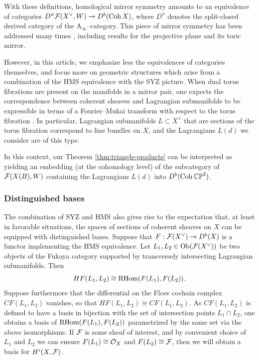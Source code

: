 \documentclass[12pt]{amsart}
\begin{document}
With these definitions, homological mirror symmetry amounts to an
equivalence of categories $D^\pi \mathcal{F}(X^\vee,W) \to D^b(\operatorname{Coh} X)$, where
$D^\pi$ denotes the split-closed derived category of the
A$_\infty$--category. This piece of mirror symmetry has been addressed
many times
\cite{ako08,ako06,seidel01b,abouzaid06,abouzaid09,fltz-T-duality},
including results for the projective plane and its toric mirror.

However, in this article, we emphasize less the equivalences of
categories themselves, and focus more on geometric structures which
arise from a combination of the HMS equivalence with the SYZ picture.
When dual torus fibrations are present on the manifolds in a mirror
pair, one expects the correspondence between coherent sheaves and
Lagrangian submanifolds to be expressible in terms of a Fourier--Mukai
transform with respect to the torus fibration \cite{lyz}. In
particular, Lagrangian submanifolds $L \subset X^\vee$ that are
sections of the torus fibration correspond to line bundles on $X$, and
the Lagrangians $L(d)$ we consider are of this type.
 
In this context, our Theorem \ref{thm:triangle-products} can be
interpreted as yielding an embedding (at the cohomology level) of the
subcategory of $\mathcal{F}(X(B),W)$ containing the Lagrangians $L(d)$ into
$D^b(\operatorname{Coh} \mathbb{CP}^2)$.


\subsubsection{Distinguished bases}
\label{sec:intro-bases}

The combination of SYZ and HMS also gives rise to the expectation
that, at least in favorable situations, the spaces of sections of
coherent sheaves on $X$ can be equipped with distinguished
bases. Suppose that $F: \mathcal{F}(X^\vee) \to D^b(X)$ is a functor
implementing the HMS equivalence. Let $L_1, L_2 \in \mathrm{Ob}(\mathcal{F}(X^\vee))$
be two objects of the Fukaya category supported by transversely
intersecting Lagrangian submanifolds. Then
\begin{equation}
  HF(L_1,L_2) \cong \mathrm{RHom}(F(L_1),F(L_2)).
\end{equation}
Suppose furthermore that the differential on the Floer cochain complex
$CF(L_1,L_2)$ vanishes, so that $HF(L_1,L_2) \cong CF(L_1,L_2)$. As
$CF(L_1,L_2)$ is defined to have a basis in bijection with the set of
intersection points $L_1\cap L_2$, one obtains a basis of
$\mathrm{RHom}(F(L_1),F(L_2))$ parametrized by the same set via the above
isomorphisms. If $\mathcal{F}$ is some sheaf of interest, and by convenient
choice of $L_1$ and $L_2$ we can ensure $F(L_1) \cong \mathcal{O}_X$ and
$F(L_2) \cong \mathcal{F}$, then we will obtain a basis for $H^i(X,\mathcal{F})$.
\end{document}
